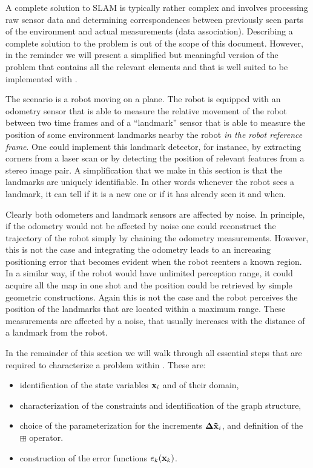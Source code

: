 \documentclass[a4paper]{article}
\begin{document}
A complete solution to SLAM is typically rather complex and involves
processing raw sensor data and determining correspondences between
previously seen parts of the environment and actual measurements (data
association). Describing a complete solution to the problem is out of
the scope of this document.  However, in the reminder we will present a
simplified but meaningful version of the problem that contains all the relevant elements
and that is well suited to be implemented with \gopt.

The scenario is a robot moving on a plane. The robot is equipped
with an odometry sensor that is able to measure the relative movement
of the robot between two time frames and of a ``landmark'' sensor
that is able to measure the position of some environment landmarks
nearby the robot \emph{in the robot reference frame}. One could
implement this landmark detector, for instance, by extracting corners
from a laser scan or by detecting the position of relevant features
from a stereo image pair. A simplification that we make in this
section is that the landmarks are uniquely identifiable. In other
words whenever the robot sees a landmark, it can tell if it is a new
one or if it has already seen it and when.

Clearly both odometers and landmark sensors are affected by noise.  In
principle, if the odometry would not be affected by noise one could
reconstruct the trajectory of the robot simply by chaining the
odometry measurements. However, this is not the case and integrating
the odometry leads to an increasing positioning error that becomes
evident when the robot reenters a known region. In a similar way,
if the robot would have unlimited perception range, it could acquire
all the map in one shot and the position could be retrieved by simple
geometric constructions. Again this is not the case and the robot
perceives the position of the landmarks that are located within a
maximum range. These measurements are affected by a noise, that
usually increases with the distance of a landmark from the robot.

In the remainder of this section we will walk through all essential
steps that are required to characterize a problem within \gopt{}.
These are:
\begin{itemize}
\item identification of the state variables $\mathbf{x}_i$ and of their domain,
\item characterization of the constraints and identification of the graph structure,
\item choice of the parameterization for the increments $\mathbf{\Delta \tilde x}_i$, and definition of the
$\boxplus$ operator.
\item construction of the error functions $e_k(\mathbf{x}_k)$.
\end{itemize}
\end{document}
